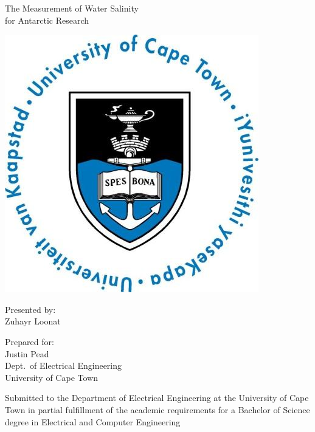 \documentclass[a4paper,12pt]{report}
\begin{document}
\thispagestyle{empty}
    {\Huge \begin{center}
        The Measurement of Water Salinity \\for Antarctic Research
    \end{center}}

    \vskip 5mm
    \begin{center}
        \includegraphics[scale = 0.35]{Figures/uctLogo.png}
    \end{center}

    \vskip 5mm
    \begin{center}
        Presented by:\\
        Zuhayr Loonat		%
    \end{center}

    \vskip 10mm
    \begin{center}
        Prepared for:\\
        Justin Pead\\ 		%
        Dept.~of Electrical Engineering\\University of Cape Town
    \end{center}


    \vskip 10mm
    \begin{center}
        Submitted to the Department of Electrical Engineering at the University of Cape Town in partial
        fulfillment of the academic requirements for a Bachelor of Science degree in Electrical and Computer Engineering
    \end{center}
\end{document}
